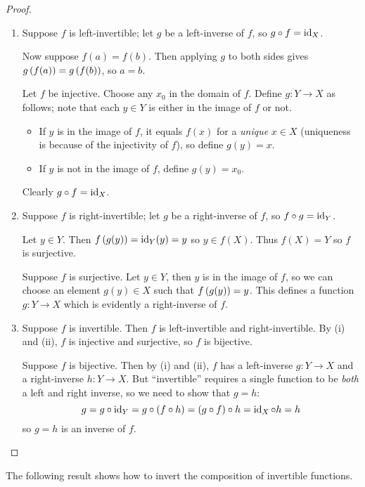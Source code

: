 \begin{proof} \
\begin{enumerate}[label=(\roman*)]
\item \fbox{$\implies$} Suppose $f$ is left-invertible; let $g$ be a left-inverse of $f$, so $g\circ f=\operatorname{id}_X$.

Now suppose $f(a)=f(b)$. Then applying $g$ to both sides gives $g\left(f(a)\right)=g\left(f(b)\right)$, so $a=b$.

\fbox{$\impliedby$} Let $f$ be injective. Choose any $x_0$ in the domain of $f$. Define $g\colon Y\to X$ as follows; note that each $y\in Y$ is either in the image of $f$ or not.
\begin{itemize}
\item If $y$ is in the image of $f$, it equals $f(x)$ for a \emph{unique} $x\in X$ (uniqueness is because of the injectivity of $f$), so define $g(y)=x$.
\item If $y$ is not in the image of $f$, define $g(y)=x_0$. 
\end{itemize}
Clearly $g\circ f=\operatorname{id}_X$.

\item \fbox{$\implies$} Suppose $f$ is right-invertible; let $g$ be a right-inverse of $f$, so $f\circ g=\operatorname{id}_Y$.

Let $y\in Y$. Then $f\left(g(y)\right)=\operatorname{id}_Y(y)=y$ so $y\in f(X)$. Thus $f(X)=Y$ so $f$ is surjective.

\fbox{$\impliedby$} Suppose $f$ is surjective. Let $y\in Y$, then $y$ is in the image of $f$, so we can choose an element $g(y)\in X$ such that $f\left(g(y)\right)=y$. This defines a function $g\colon Y\to X$ which is evidently a right-inverse of $f$.

\item \fbox{$\implies$} Suppose $f$ is invertible. Then $f$ is left-invertible and right-invertible. By (i) and (ii), $f$ is injective and surjective, so $f$ is bijective.

\fbox{$\impliedby$} Suppose $f$ is bijective. Then by (i) and (ii), $f$ has a left-inverse $g\colon Y\to X$ and a right-inverse $h\colon Y\to X$. But ``invertible'' requires a single function to be \emph{both} a left and right inverse, so we need to show that $g=h$:
\[g=g\circ\operatorname{id}_Y=g\circ(f\circ h)=(g\circ f)\circ h=\operatorname{id}_X\circ h=h\]
so $g=h$ is an inverse of $f$.
\end{enumerate}
\end{proof}

The following result shows how to invert the composition of invertible functions.

